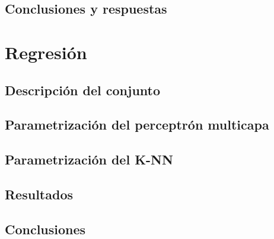 \documentclass[a4paper, 11pt, twoside, openany, onecolumn, final]{memoir}
\begin{document}
	\section{Conclusiones y respuestas}
	\chapter{Regresión}
		\section{Descripción del conjunto}
	\section{Parametrización del perceptrón multicapa}
	\section{Parametrización del K-NN}
	\section{Resultados}
	\section{Conclusiones}
\end{document}
